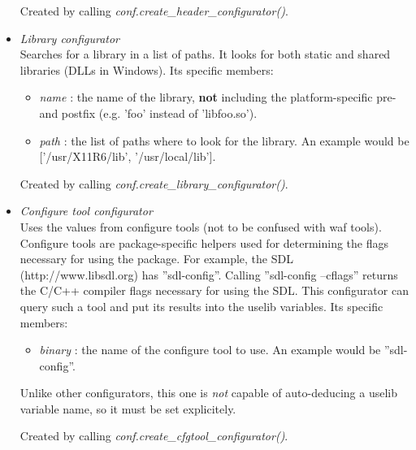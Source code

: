 \documentclass[a4,10pt]{article}
\begin{document}
\begin{itemize}
	Created by calling \emph{conf.create\_header\_configurator()}.

	\item \emph{Library configurator}\\
	Searches for a library in a list of paths. It looks for both static and shared libraries (DLLs in Windows).
	Its specific members:
	\begin{itemize}
		\item \emph{name} : the name of the library, {\bf not} including the platform-specific pre- and postfix (e.g. 'foo' instead of 'libfoo.so').
		\item \emph{path} : the list of paths where to look for the library. An example would be ['/usr/X11R6/lib', '/usr/local/lib'].
	\end{itemize}

	Created by calling \emph{conf.create\_library\_configurator()}.

	\item \emph{Configure tool configurator}\\
	Uses the values from configure tools (not to be confused with waf tools). Configure tools are package-specific helpers used for determining the flags necessary for using the package. For example, the SDL (http://www.libsdl.org) has ''sdl-config''. Calling ''sdl-config --cflags'' returns the C/C++ compiler flags necessary for using the SDL.
	This configurator can query such a tool and put its results into the uselib variables.
	Its specific members:
	\begin{itemize}
		\item \emph{binary} : the name of the configure tool to use. An example would be ''sdl-config''.
	\end{itemize}
	Unlike other configurators, this one is \emph{not} capable of auto-deducing a uselib variable name, so it must be set explicitely.

	Created by calling \emph{conf.create\_cfgtool\_configurator()}.


\end{itemize}
\end{document}
